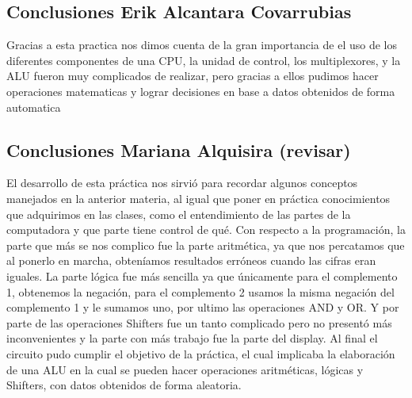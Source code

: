 	\subsection{Conclusiones Erik Alcantara Covarrubias }
Gracias a esta practica nos dimos cuenta de la gran importancia de el uso de los diferentes componentes de una CPU, la unidad de control, los multiplexores, y la ALU fueron muy complicados de realizar, pero gracias a ellos pudimos hacer operaciones matematicas y lograr decisiones en base a datos obtenidos de forma automatica
	\subsection{Conclusiones Mariana Alquisira (revisar)}
	El desarrollo de esta pr\'actica nos sirvi\'o para recordar algunos conceptos manejados en la anterior materia, al igual que poner en pr\'actica conocimientos que adquirimos en las clases, como el entendimiento de las partes de la computadora y que parte tiene control de qu\'e.
Con respecto a la programaci\'on, la parte que m\'as se nos complico fue la parte aritm\'etica, ya que nos percatamos que al ponerlo en marcha, obten\'iamos resultados err\'oneos cuando las cifras eran iguales. La parte l\'ogica fue m\'as sencilla ya que \'unicamente para el complemento 1, obtenemos la negaci\'on, para el complemento 2 usamos la misma negaci\'on del complemento 1 y le sumamos uno, por ultimo las operaciones AND y OR. Y por parte de las operaciones Shifters fue un tanto complicado pero no present\'o m\'as inconvenientes y la parte con m\'as trabajo fue la parte del display.
Al final el circuito pudo cumplir el objetivo de la pr\'actica, el cual implicaba la elaboraci\'on de una ALU en la cual se pueden hacer operaciones aritm\'eticas, l\'ogicas y Shifters, con datos obtenidos de forma aleatoria.